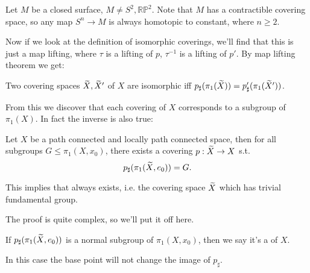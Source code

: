 \begin{example}
    Let $M$ be a closed surface, $M \ne S^2, \mathbb{RP}^2$.
	Note that $M$ has a contractible covering space,
	so any map $S^n \to M$ is always homotopic to constant, where $n\ge 2$.
\end{example}

Now if we look at the definition of isomorphic coverings,
we'll find that this is just a map lifting, where $\tau$ is a lifting
of $p$, $\tau^{-1}$ is a lifting of $p'$.
By map lifting theorem we get:
\begin{corollary}
    Two covering spaces $\widetilde{X}, \widetilde{X}'$ of $X$ are isomorphic
	iff $p_\sharp(\pi_1(\widetilde{X})) = p'_\sharp(\pi_1(\widetilde{X}'))$.
\end{corollary}

	From this we discover that each covering of $X$ corresponds
to a subgroup of $\pi_1(X)$. In fact the inverse is also true:
\begin{theorem}
	\label{thm:eocs}
    Let $X$ be a path connected and locally path connected space,
	then for all subgroups $G \leqslant \pi_1(X, x_0)$,
	there exists a covering $p: \widetilde{X} \to X$ s.t.
	\[
	p_\sharp(\pi_1(\widetilde{X}, e_0)) = G.
	\]
\end{theorem}
\begin{remark}
    This implies that  always exists,
	i.e. the covering space $\widetilde{X}$ which has trivial fundamental group.
\end{remark}

The proof is quite complex, so we'll put it off here.

\begin{definition}
	If $p_\sharp(\pi_1(\widetilde{X}, e_0))$ is a normal subgroup of $\pi_1(X, x_0)$,
	then we say it's a  of $X$.
\end{definition}
In this case the base point will not change the image of $p_\sharp$.
